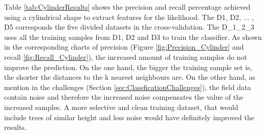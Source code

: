 \documentclass{subfiles}
\begin{document}
   \par Table \ref{tab:CylinderResults} shows the precision and recall percentage achieved using a cylindrical shape to extract features for the likelihood.  The D1, D2, ... , D5 corresponds the five divided datasets in the cross-validation. The D\_1\_2\_3 uses all the training samples from D1, D2 and D3 to train the classifier. As shown in the corresponding charts  of precision (Figure \ref{fig:Precision_Cylinder} and recall \ref{fig:Recall_Cylinder}), the increased amount of training samples do not improve the prediction. On the one hand, the bigger the training sample set is, the shorter the distances to the k nearest neighbours are. On the other hand, as mention in the challenges (Section \ref{sec:ClassficationChallenges}), the field data contain noise and therefore the increased noise compensates the value of the increased samples. A more selective and clean training dataset, that would include trees of similar height and less noise would have definitely improved the results. 
   
\end{document}
